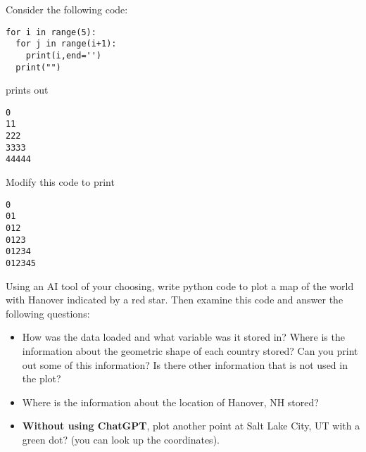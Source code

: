  \begin{exercise}
 
 

Consider the following code:

\begin{Verbatim}
for i in range(5):
  for j in range(i+1):
    print(i,end='')
  print("")
\end{Verbatim}
prints out
\begin{Verbatim}
0
11
222
3333
44444
\end{Verbatim}
Modify this code to print
\begin{Verbatim}
0
01
012
0123
01234
012345
\end{Verbatim}
\end{exercise}


 \begin{exercise}
Using an AI tool of your choosing, write python code to plot a map of the world with Hanover indicated by a red star. 
 Then examine this code and answer the following questions: 
 \begin{itemize}
 \item How was the data loaded and what variable was it stored in?  Where is the information about the geometric shape of each country stored? Can you print out some of this information? Is there other information that is not used in the plot? 
 \item Where is the information about the location of Hanover, NH stored? 
 \item {\bf Without using ChatGPT}, plot another point at Salt Lake City, UT with a green dot? (you can look up the coordinates). 
 \end{itemize}
 
 \end{exercise}






